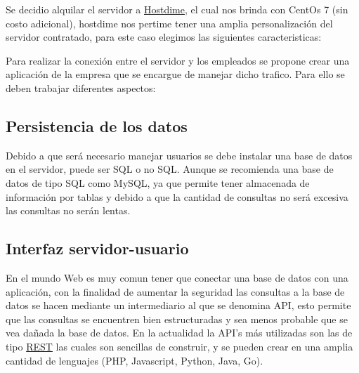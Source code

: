 \documentclass[11pt]{article}
\begin{document}
        Se decidio alquilar el servidor a \href{https://www.hostdime.com.ar/}{Hostdime}, el cual nos brinda con CentOs 7 (sin costo adicional), 
        hostdime nos pertime tener una amplia personalización del servidor contratado, para este caso elegimos las siguientes caracteristicas: 

        \begin{table}[H]
            \centering
            
        \end{table}

        Para realizar la conexión entre el servidor y los empleados se propone crear una aplicación de la empresa que se encargue de manejar dicho trafico. 
        Para ello se deben trabajar diferentes aspectos: 

        \subsection{Persistencia de los datos}

        Debido a que será necesario manejar usuarios se debe instalar una base de datos en el servidor, puede ser SQL o no SQL.
        Aunque se recomienda una base de datos de tipo SQL como MySQL, ya que permite tener almacenada de información por tablas 
        y debido a que la cantidad de consultas no será excesiva las consultas no serán lentas. 

        \subsection{Interfaz servidor-usuario}

        En el mundo Web es muy comun tener que conectar una base de datos con una aplicación, con la finalidad de aumentar la seguridad las 
        consultas a la base de datos se hacen mediante un intermediario al que se denomina API, esto permite que las consultas 
        se encuentren bien estructuradas y sea menos probable que se vea dañada la base de datos. En la actualidad la API's más utilizadas son 
        las de tipo \href{https://rockcontent.com/es/blog/api-rest/#:~:text=Antes%20de%20introducir%20el%20concepto,comunicaci%C3%B3n%20de%20datos%20entre%20aplicaciones.}{REST} las cuales son sencillas de construir, y se pueden crear en una amplia cantidad de lenguajes (PHP, Javascript, Python, Java, Go).

    
\end{document}
